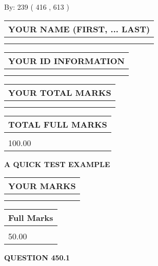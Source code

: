 \documentclass[12pt]{article}
\begin{document}
   
\hspace{1.0in} By: 
 239 ( 416 ,  613 )
   
   
   
   
\newpage 
\setcounter{page}{ 
   450001 } 
   
   
   
   
\noindent\begin{tabular}{|l|}
\hline
YOUR NAME (FIRST, ... LAST)  \\
\hline
 \\ 
 \\ 
\hline
\end{tabular}
\hspace{0.05in} \begin{tabular}{|l|}
\hline
 YOUR   ID   INFORMATION  \\
\hline
 \\ 
 \\ 
\hline
\end{tabular}
   
   
\vspace{0.2in}\noindent\begin{tabular}{|l|}
\hline
YOUR TOTAL MARKS  \\
\hline
 \\ 
 \\ 
\hline
\end{tabular}
\hspace{0.05in} \begin{tabular}{|l|}
\hline
TOTAL FULL MARKS  \\
\hline
 \\ 
100.00 \\
\hline
\end{tabular}
   
   
 \vspace{0.2in}
{\LARGE {\textbf{ A QUICK TEST EXAMPLE}}}
   
   
  
\vspace{0.2in}
  
\noindent\begin{tabular}{|l|}
\hline
 YOUR MARKS  \\
\hline
 \\ 
 \\ 
\hline
\end{tabular}
\hspace{0.05in} \begin{tabular}{|l|}
\hline
 Full Marks  \\
\hline
 \\ 
50.00 \\
\hline
\end{tabular}
{\textbf{\Large{QUESTION
450.1 
}}}
  
\end{document}
